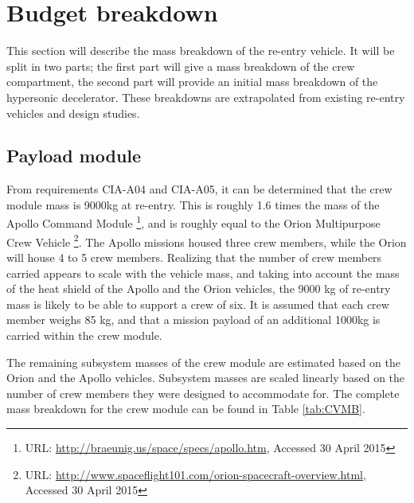 \section{Budget breakdown} \label{ch:budget}
This section will describe the mass breakdown of the re-entry vehicle. It will be split in two parts; the first part will give a mass breakdown of the crew compartment, the second part will provide an initial mass breakdown of the hypersonic decelerator. These breakdowns are extrapolated from existing re-entry vehicles and design studies.

\subsection{Payload module}
From requirements CIA-A04 and CIA-A05, it can be determined that the crew module mass is 9000kg at re-entry. This is roughly 1.6 times the mass of the Apollo Command Module \footnote{URL: \url{http://braeunig.us/space/specs/apollo.htm}, Accessed 30 April 2015}, and is roughly equal to the Orion Multipurpose Crew Vehicle \footnote{URL: \url{http://www.spaceflight101.com/orion-spacecraft-overview.html}, Accessed 30 April 2015}. The Apollo missions housed three crew members, while the Orion will house 4 to 5 crew members. Realizing that the number of crew members carried appears to scale with the vehicle mass, and taking into account the mass of the heat shield of the Apollo and the Orion vehicles, the 9000 kg of re-entry mass is likely to be able to support a crew of six. It is assumed that each crew member weighs 85 kg, and that a mission payload of an additional 1000kg is carried within the crew module. 

The remaining subsystem masses of the crew module are estimated based on the Orion and the Apollo vehicles. Subsystem masses are scaled linearly based on the number of crew members they were designed to accommodate for. The complete mass breakdown for the crew module can be found in Table \ref{tab:CVMB}.

